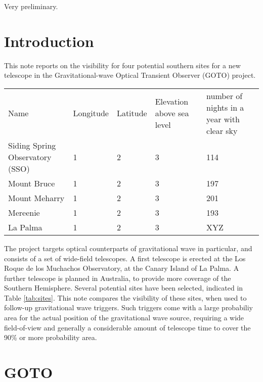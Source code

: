 \documentclass[twocolumn]{article}
\begin{document}
Very preliminary.

\section{Introduction}

This note reports on the visibility for four potential southern sites
for a new telescope in the Gravitational-wave Optical Transient
Observer (GOTO) project.

\begin{table*}
  \begin{tabular}{p{4cm}|p{2cm}|p{2cm}|p{2cm}|p{3cm}}
    Name & Longitude & Latitude & Elevation above sea level
    & number of nights in a year with clear sky\footnotemark \\
    Siding Spring Observatory (SSO) & 1 & 2 & 3 & 114 \\
    Mount Bruce & 1 & 2 & 3 & 197 \\
    Mount Meharry & 1 & 2 & 3 & 201 \\
    Mereenie & 1 & 2 & 3 & 193 \\
    \hline
    La Palma & 1 & 2 & 3 & XYZ \\
    \end{tabular}
  \caption{Details of the potential sites. La Palma (Los Roque de los
    Muchachos Observatory) contains the Northern telescope of the GOTO
    project and is given as reference.}
  \label{tab:sites}
\end{table*}
 
The project targets optical counterparts of gravitational wave in
particular, and consists of a set of wide-field telescopes. A first
telescope is erected at the Los Roque de los Muchachos Observatory, at
the Canary Island of La Palma. A further telescope is planned in
Australia, to provide more coverage of the Southern Hemisphere.
Several potential sites have been selected, indicated in Table
\ref{tab:sites}. This note compares the visibility of these sites,
when used to follow-up gravitational wave triggers. Such triggers come
with a large probabiliy area for the actual position of the
gravitational wave source, requiring a wide field-of-view and
generally a considerable amount of telescope time to cover the 90\% or
more probability area.

\section{GOTO}
\end{document}
